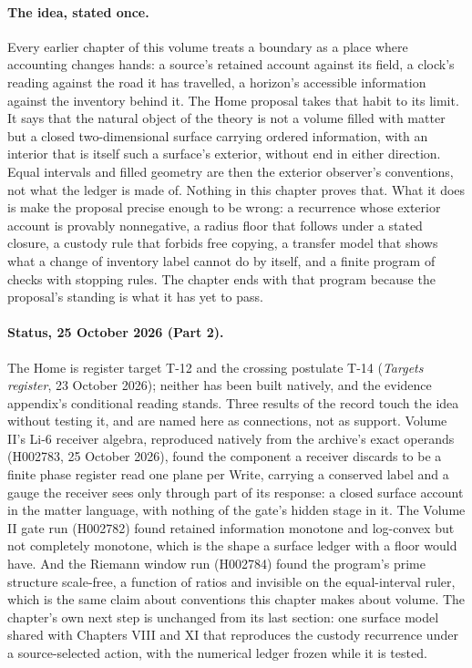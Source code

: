 

\paragraph*{The idea, stated once.} Every earlier chapter of this volume treats a boundary as a place where accounting changes hands: a source's retained account against its field, a clock's reading against the road it has travelled, a horizon's accessible information against the inventory behind it. The Home proposal takes that habit to its limit. It says that the natural object of the theory is not a volume filled with matter but a closed two-dimensional surface carrying ordered information, with an interior that is itself such a surface's exterior, without end in either direction. Equal intervals and filled geometry are then the exterior observer's conventions, not what the ledger is made of. Nothing in this chapter proves that. What it does is make the proposal precise enough to be wrong: a recurrence whose exterior account is provably nonnegative, a radius floor that follows under a stated closure, a custody rule that forbids free copying, a transfer model that shows what a change of inventory label cannot do by itself, and a finite program of checks with stopping rules. The chapter ends with that program because the proposal's standing is what it has yet to pass.

\paragraph*{Status, 25 October 2026 (Part 2).} The Home is register target T-12 and the crossing postulate T-14 (\textit{Targets register}, 23 October 2026); neither has been built natively, and the evidence appendix's conditional reading stands. Three results of the record touch the idea without testing it, and are named here as connections, not as support. Volume II's Li-6 receiver algebra, reproduced natively from the archive's exact operands (H002783, 25 October 2026), found the component a receiver discards to be a finite phase register read one plane per Write, carrying a conserved label and a gauge the receiver sees only through part of its response: a closed surface account in the matter language, with nothing of the gate's hidden stage in it. The Volume II gate run (H002782) found retained information monotone and log-convex but not completely monotone, which is the shape a surface ledger with a floor would have. And the Riemann window run (H002784) found the program's prime structure scale-free, a function of ratios and invisible on the equal-interval ruler, which is the same claim about conventions this chapter makes about volume. The chapter's own next step is unchanged from its last section: one surface model shared with Chapters VIII and XI that reproduces the custody recurrence under a source-selected action, with the numerical ledger frozen while it is tested.


